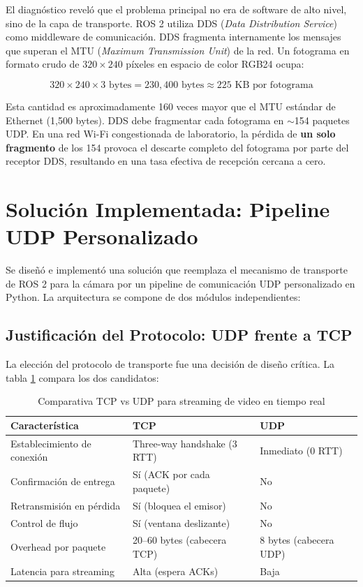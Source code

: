 \documentclass[12pt,a4paper]{article}
\begin{document}
El diagn\'ostico revel\'o que el problema principal no era de software de alto nivel, sino de la capa de transporte. ROS 2 utiliza DDS (\textit{Data Distribution Service}) como middleware de comunicaci\'on. DDS fragmenta internamente los mensajes que superan el MTU (\textit{Maximum Transmission Unit}) de la red. Un fotograma en formato crudo de $320\times240$ p\'ixeles en espacio de color RGB24 ocupa:

\[
320 \times 240 \times 3 \text{ bytes} = 230{,}400 \text{ bytes} \approx 225 \text{ KB por fotograma}
\]

Esta cantidad es aproximadamente 160 veces mayor que el MTU est\'andar de Ethernet (1,500 bytes). DDS debe fragmentar cada fotograma en $\sim$154 paquetes UDP. En una red Wi-Fi congestionada de laboratorio, la p\'erdida de \textbf{un solo fragmento} de los 154 provoca el descarte completo del fotograma por parte del receptor DDS, resultando en una tasa efectiva de recepci\'on cercana a cero.

\section{Soluci\'on Implementada: Pipeline UDP Personalizado}

Se dise\~n\'o e implement\'o una soluci\'on que reemplaza el mecanismo de transporte de ROS 2 para la c\'amara por un pipeline de comunicaci\'on UDP personalizado en Python. La arquitectura se compone de dos m\'odulos independientes:

\subsection{Justificaci\'on del Protocolo: UDP frente a TCP}

La elecci\'on del protocolo de transporte fue una decisi\'on de dise\~no cr\'itica. La tabla \ref{tab:protocolo} compara los dos candidatos:

\begin{table}[H]
\centering
\begin{tabular}{lll}
\toprule
\textbf{Caracter\'istica} & \textbf{TCP} & \textbf{UDP} \\
\midrule
Establecimiento de conexi\'on & Three-way handshake (3 RTT) & Inmediato (0 RTT) \\
Confirmaci\'on de entrega & S\'i (ACK por cada paquete) & No \\
Retransmisi\'on en p\'erdida & S\'i (bloquea el emisor) & No \\
Control de flujo & S\'i (ventana deslizante) & No \\
Overhead por paquete & 20--60 bytes (cabecera TCP) & 8 bytes (cabecera UDP) \\
Latencia para streaming & Alta (espera ACKs) & Baja \\
\bottomrule
\end{tabular}
\caption{Comparativa TCP vs UDP para streaming de video en tiempo real}
\label{tab:protocolo}
\end{table}
\end{document}
